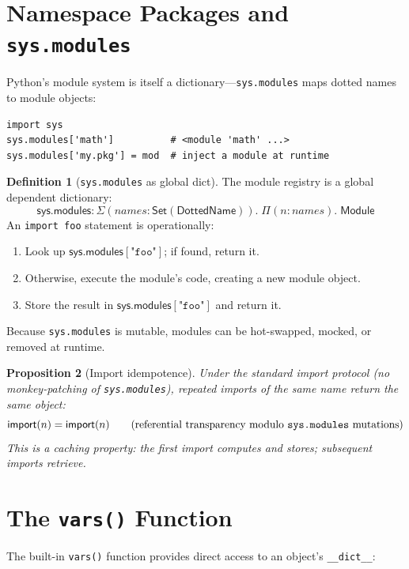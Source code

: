 \documentclass[11pt,a4paper]{report}
\theoremstyle{definition}
\newtheorem{definition}{Definition}[chapter]
\theoremstyle{plain}
\newtheorem{proposition}[definition]{Proposition}
\begin{document}
\section{Namespace Packages and \texttt{sys.modules}}

Python's module system is itself a dictionary---\lstinline[style=python]{sys.modules}
maps dotted names to module objects:

\begin{lstlisting}[style=python]
import sys
sys.modules['math']          # <module 'math' ...>
sys.modules['my.pkg'] = mod  # inject a module at runtime
\end{lstlisting}

\begin{definition}[\texttt{sys.modules} as global dict]
The module registry is a global dependent dictionary:
\[
  \mathsf{sys.modules} : \Sigma(\mathit{names} : \mathsf{Set}(\mathsf{DottedName})).\;
    \Pi(n : \mathit{names}).\; \mathsf{Module}
\]
An \lstinline[style=python]{import foo} statement is operationally:
\begin{enumerate}
  \item Look up $\mathsf{sys.modules}[\texttt{"foo"}]$; if found, return it.
  \item Otherwise, execute the module's code, creating a new module object.
  \item Store the result in $\mathsf{sys.modules}[\texttt{"foo"}]$ and return it.
\end{enumerate}
Because \lstinline[style=python]{sys.modules} is mutable, modules can be
hot-swapped, mocked, or removed at runtime.
\end{definition}

\begin{proposition}[Import idempotence]
Under the standard import protocol (no monkey-patching of
\lstinline[style=python]{sys.modules}), repeated imports of the same name
return the same object:
\[
  \mathsf{import}(n) = \mathsf{import}(n) \qquad
  \text{(referential transparency modulo \texttt{sys.modules} mutations)}
\]
This is a \emph{caching} property: the first import computes and stores;
subsequent imports retrieve.
\end{proposition}

\section{The \texttt{vars()} Function}

The built-in \lstinline[style=python]{vars()} function provides direct
access to an object's \lstinline[style=python]{__dict__}:
\end{document}
